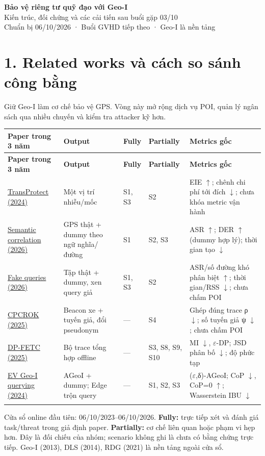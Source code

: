 \documentclass[11pt,a4paper]{article}
\begin{document}
\begin{center}{\LARGE\bfseries\color{ink}Bảo vệ riêng tư quỹ đạo với Geo-I}\\[5pt]{\large Kiến trúc, đối chứng và các cải tiến sau buổi gặp 03/10}\\[4pt]{\small Chuẩn bị 06/10/2026 · Buổi GVHD tiếp theo · Geo-I là nền tảng}\end{center}
\section*{1. Related works và cách so sánh công bằng}
Giữ Geo-I làm cơ chế bảo vệ GPS. Vòng này mở rộng dịch vụ POI, quản lý ngân sách qua nhiều chuyến và kiểm tra attacker kỹ hơn.

\begingroup\small
\begin{longtable}{@{}P{3.580cm}P{3.708cm}P{1.534cm}P{2.174cm}P{5.243cm}@{}}
\toprule
\textbf{Paper trong 3 năm} & \textbf{Output} & \textbf{Fully} & \textbf{Partially} & \textbf{Metrics gốc}\\\midrule
\endfirsthead
\toprule
\textbf{Paper trong 3 năm} & \textbf{Output} & \textbf{Fully} & \textbf{Partially} & \textbf{Metrics gốc}\\\midrule
\endhead\bottomrule\endfoot
\href{https://arxiv.org/html/2409.09495v1}{TransProtect (2024)} & Một vị trí nhiễu/mốc & S1, S3 & S2 & EIE $\uparrow$; chênh chi phí tới đích $\downarrow$; chưa khóa metric vận hành\\
\addlinespace[2pt]
\href{https://link.springer.com/article/10.1007/s44443-026-00899-w}{Semantic correlation (2026)} & GPS thật + dummy theo ngữ nghĩa/đường & S1 & S2, S3 & ASR $\uparrow$; DER $\uparrow$ (dummy hợp lý); thời gian tạo $\downarrow$\\
\addlinespace[2pt]
\href{https://link.springer.com/article/10.1007/s44443-025-00438-z}{Fake queries (2026)} & Tập thật + dummy, xen query giả & S1, S3 & S2 & ASR/số đường khó phân biệt $\uparrow$; thời gian/RSS $\downarrow$; chưa chấm POI\\
\addlinespace[2pt]
\href{https://uhra.herts.ac.uk/id/eprint/25705/}{CPCROK (2025)} & Beacon xe + tuyến giả, đổi pseudonym & — & S4 & Ghép đúng trace ρ $\downarrow$; số tuyến giả ψ $\downarrow$; chưa chấm POI\\
\addlinespace[2pt]
\href{https://www.aimspress.com/article/doi/10.3934/era.2025293}{DP-FETC (2025)} & Bộ trace tổng hợp offline & — & S3, S8, S9, S10 & MI $\downarrow$, $\varepsilon$-DP; JSD phân bố $\downarrow$; độ phức tạp\\
\addlinespace[2pt]
\href{https://wrap.warwick.ac.uk/id/eprint/183198/}{EV Geo-I querying (2024)} & AGeoI + dummy; Edge trộn query & — & S1, S2, S3 & ($\varepsilon$,δ)-AGeoI; CoP $\downarrow$, CoP=0 $\uparrow$; Wasserstein IBU $\downarrow$\\
\addlinespace[2pt]
\end{longtable}
\endgroup
Cửa sổ online đầu tiên: 06/10/2023–06/10/2026. \textbf{Fully:} trực tiếp xét và đánh giá task/threat trong giả định paper. \textbf{Partially:} cơ chế liên quan hoặc phạm vi hẹp hơn. Đây là đối chiếu của nhóm; scenario không ghi là chưa có bằng chứng trực tiếp. Geo-I (2013), DLS (2014), RDG (2021) là nền tảng ngoài cửa sổ.
\end{document}
